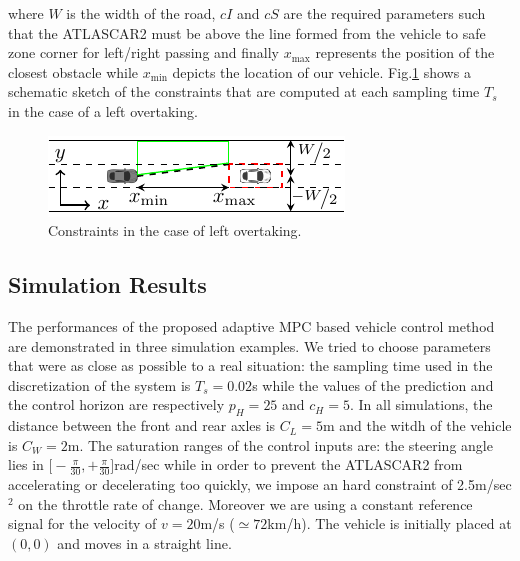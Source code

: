 \documentclass[conference, 11pt]{IEEEtran}
\begin{document}
where $W$ is the width of the road, $cI$ and $cS$ are the required parameters such that the ATLASCAR2 must be above the line formed from the vehicle to safe zone corner for left/right passing and finally $x_{\max}$ represents the position of the closest obstacle while $x_{\min}$ depicts the location of our vehicle. Fig.\ref{fig:constraint} shows a schematic sketch of the constraints that are computed at each sampling time $T_s$ in the case of a left overtaking.
\begin{figure}[H]
	\centering
	\includegraphics[width=1\columnwidth]{./figure/constraint/constraint.pdf}
	\vspace{-20pt}
	\caption{Constraints in the case of left overtaking.}
	\label{fig:constraint}
\end{figure}
\subsection{Simulation Results}
The performances of the proposed adaptive MPC based vehicle control method are demonstrated in three
simulation examples. We tried to choose parameters that were as close as possible to a real situation: the sampling time used in the discretization of the system is $T_s= 0.02$s while the values of the prediction and the control horizon are respectively $p_H=25$ and $c_H=5$. In all simulations, the distance between the front and rear axles is $C_L=5$m and the witdh of the vehicle is $C_W=2$m. The saturation ranges of the control inputs are: the steering angle lies in $\big[-\frac{\pi}{30}, +\frac{\pi}{30}\big]$rad/sec while in order to prevent the ATLASCAR2 from accelerating or decelerating too quickly, we impose an hard constraint of 2.5m/sec$^2$ on the throttle rate of change. Moreover we are using a constant reference signal for the velocity of $v=20$m/s ($\simeq72$km/h).
The vehicle is initially placed at $(0,0)$ and moves in a s­traight line.
\end{document}

